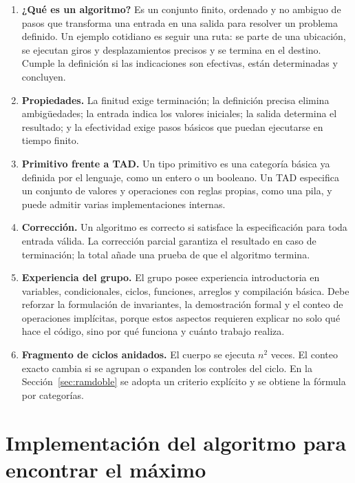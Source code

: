 \documentclass[12pt,letterpaper]{article}
\begin{document}
\begin{enumerate}
  \item \textbf{¿Qué es un algoritmo?} Es un conjunto finito, ordenado y no ambiguo de pasos que transforma una entrada en una salida para resolver un problema definido. Un ejemplo cotidiano es seguir una ruta: se parte de una ubicación, se ejecutan giros y desplazamientos precisos y se termina en el destino. Cumple la definición si las indicaciones son efectivas, están determinadas y concluyen.

  \item \textbf{Propiedades.} La finitud exige terminación; la definición precisa elimina ambigüedades; la entrada indica los valores iniciales; la salida determina el resultado; y la efectividad exige pasos básicos que puedan ejecutarse en tiempo finito.

  \item \textbf{Primitivo frente a TAD.} Un tipo primitivo es una categoría básica ya definida por el lenguaje, como un entero o un booleano. Un TAD especifica un conjunto de valores y operaciones con reglas propias, como una pila, y puede admitir varias implementaciones internas.

  \item \textbf{Corrección.} Un algoritmo es correcto si satisface la especificación para toda entrada válida. La corrección parcial garantiza el resultado en caso de terminación; la total añade una prueba de que el algoritmo termina.

  \item \textbf{Experiencia del grupo.} El grupo posee experiencia introductoria en variables, condicionales, ciclos, funciones, arreglos y compilación básica. Debe reforzar la formulación de invariantes, la demostración formal y el conteo de operaciones implícitas, porque estos aspectos requieren explicar no solo qué hace el código, sino por qué funciona y cuánto trabajo realiza.

  \item \textbf{Fragmento de ciclos anidados.} El cuerpo se ejecuta $n^2$ veces. El conteo exacto cambia si se agrupan o expanden los controles del ciclo. En la Sección~\ref{sec:ramdoble} se adopta un criterio explícito y se obtiene la fórmula por categorías.
\end{enumerate}

\section{Implementación del algoritmo para encontrar el máximo}
\end{document}
